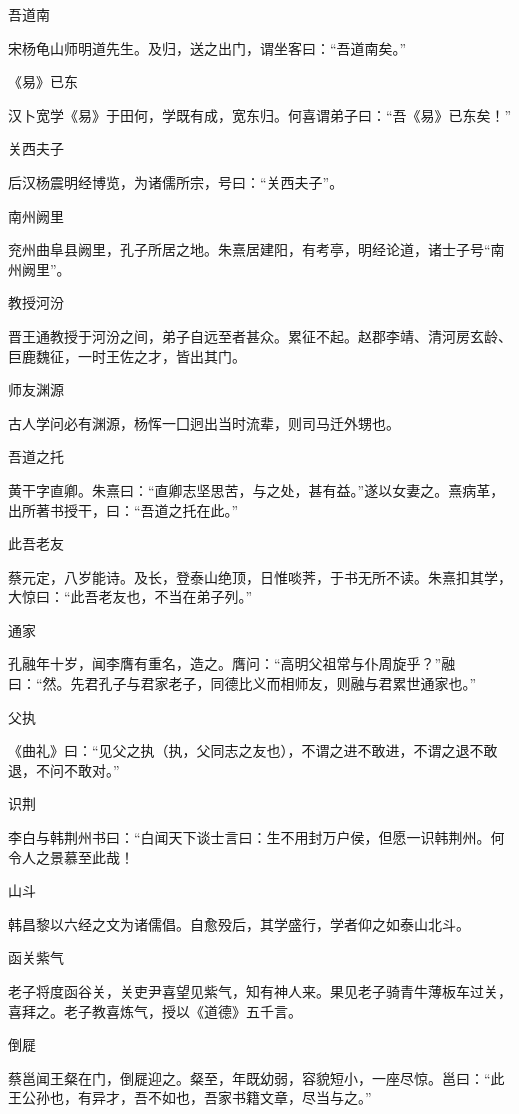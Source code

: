 \documentclass[a4paper,12pt,UTF8,twoside]{ctexbook}
\begin{document}
    吾道南
    
    宋杨龟山师明道先生。及归，送之出门，谓坐客曰：“吾道南矣。”
    
    《易》已东
    
    汉卜宽学《易》于田何，学既有成，宽东归。何喜谓弟子曰：“吾《易》已东矣！”
    
    关西夫子
    
    后汉杨震明经博览，为诸儒所宗，号曰：“关西夫子”。
    
    南州阙里
    
    兖州曲阜县阙里，孔子所居之地。朱熹居建阳，有考亭，明经论道，诸士子号“南州阙里”。
    
    教授河汾
    
    晋王通教授于河汾之间，弟子自远至者甚众。累征不起。赵郡李靖、清河房玄龄、巨鹿魏征，一时王佐之才，皆出其门。
    
    师友渊源
    
    古人学问必有渊源，杨恽一囗迥出当时流辈，则司马迁外甥也。
    
    吾道之托
    
    黄干字直卿。朱熹曰：“直卿志坚思苦，与之处，甚有益。”遂以女妻之。熹病革，出所著书授干，曰：“吾道之托在此。”
    
    此吾老友
    
    蔡元定，八岁能诗。及长，登泰山绝顶，日惟啖荠，于书无所不读。朱熹扣其学，大惊曰：“此吾老友也，不当在弟子列。”
    
    通家
    
    孔融年十岁，闻李膺有重名，造之。膺问：“高明父祖常与仆周旋乎？”融曰：“然。先君孔子与君家老子，同德比义而相师友，则融与君累世通家也。”
    
    父执
    
    《曲礼》曰：“见父之执（执，父同志之友也），不谓之进不敢进，不谓之退不敢退，不问不敢对。”
    
    识荆
    
    李白与韩荆州书曰：“白闻天下谈士言曰：生不用封万户侯，但愿一识韩荆州。何令人之景慕至此哉！
    
    山斗
    
    韩昌黎以六经之文为诸儒倡。自愈殁后，其学盛行，学者仰之如泰山北斗。
    
    函关紫气
    
    老子将度函谷关，关吏尹喜望见紫气，知有神人来。果见老子骑青牛薄板车过关，喜拜之。老子教喜炼气，授以《道德》五千言。
    
    倒屣
    
    蔡邕闻王粲在门，倒屣迎之。粲至，年既幼弱，容貌短小，一座尽惊。邕曰：“此王公孙也，有异才，吾不如也，吾家书籍文章，尽当与之。”
    
\end{document}
